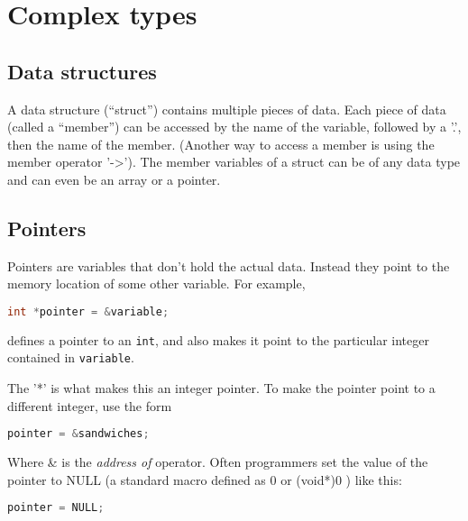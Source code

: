 \section{Complex types}\label{Complex_types}
\subsection{Data structures}
A data structure (``struct'') contains multiple pieces of data.  Each piece of
data (called a ``member'') can be accessed by the name of the variable,
followed by a '.', then the name of the member.  (Another way to access a
member is using the member operator '-\textgreater{}').  The member variables
of a struct can be of any data type and can even be an array or a pointer.

\subsection{Pointers}
Pointers are variables that don't hold the actual data. Instead they point to
the memory location of some other variable.  For example,
\lstset{basicstyle=\scriptsize, numbers=left, captionpos=b, tabsize=4}
\begin{lstlisting}[caption=Section \thesection listing \arabic{comtypcnt},language={C},
breaklines=true,xleftmargin=15pt,label=lst:section\thesection listing\arabic{comtypcnt}]
int *pointer = &variable;
\end{lstlisting}

defines a pointer to an \texttt{int}, and also makes it point to the particular
integer contained in \texttt{variable}.

The '*' is what makes this an integer pointer.  To make the pointer point to a
different integer, use the form
\lstset{basicstyle=\scriptsize, numbers=left, captionpos=b, tabsize=4}
\begin{lstlisting}[caption=Section \thesection listing \arabic{comtypcnt},language={C},
breaklines=true,xleftmargin=15pt,label=lst:section\thesection listing\arabic{comtypcnt}]
pointer = &sandwiches;
\end{lstlisting}

Where \& is the \emph{address of} operator.  Often programmers set the value of
the pointer to NULL (a standard macro defined as 0 or (void*)0 ) like this:
\lstset{basicstyle=\scriptsize, numbers=left, captionpos=b, tabsize=4}
\begin{lstlisting}[caption=Section \thesection listing \arabic{comtypcnt},language={C},
breaklines=true,xleftmargin=15pt,label=lst:section\thesection listing\arabic{comtypcnt}]
pointer = NULL;
\end{lstlisting}

